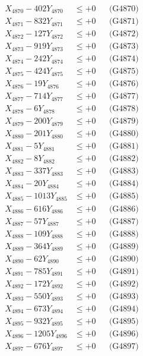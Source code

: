 \documentclass[a4paper,10pt]{article}
\begin{document}
{\begin{align}
X_{4870} - 402Y_{4870} &\leq +0 && \text{(G4870)} \\
\allowbreak
X_{4871} - 832Y_{4871} &\leq +0 && \text{(G4871)} \\
X_{4872} - 127Y_{4872} &\leq +0 && \text{(G4872)} \\
X_{4873} - 919Y_{4873} &\leq +0 && \text{(G4873)} \\
X_{4874} - 242Y_{4874} &\leq +0 && \text{(G4874)} \\
X_{4875} - 424Y_{4875} &\leq +0 && \text{(G4875)} \\
X_{4876} - 19Y_{4876} &\leq +0 && \text{(G4876)} \\
X_{4877} - 714Y_{4877} &\leq +0 && \text{(G4877)} \\
X_{4878} - 6Y_{4878} &\leq +0 && \text{(G4878)} \\
X_{4879} - 200Y_{4879} &\leq +0 && \text{(G4879)} \\
X_{4880} - 201Y_{4880} &\leq +0 && \text{(G4880)} \\
\allowbreak
X_{4881} - 5Y_{4881} &\leq +0 && \text{(G4881)} \\
X_{4882} - 8Y_{4882} &\leq +0 && \text{(G4882)} \\
X_{4883} - 337Y_{4883} &\leq +0 && \text{(G4883)} \\
X_{4884} - 20Y_{4884} &\leq +0 && \text{(G4884)} \\
X_{4885} - 1013Y_{4885} &\leq +0 && \text{(G4885)} \\
X_{4886} - 616Y_{4886} &\leq +0 && \text{(G4886)} \\
X_{4887} - 57Y_{4887} &\leq +0 && \text{(G4887)} \\
X_{4888} - 109Y_{4888} &\leq +0 && \text{(G4888)} \\
X_{4889} - 364Y_{4889} &\leq +0 && \text{(G4889)} \\
X_{4890} - 62Y_{4890} &\leq +0 && \text{(G4890)} \\
\allowbreak
X_{4891} - 785Y_{4891} &\leq +0 && \text{(G4891)} \\
X_{4892} - 172Y_{4892} &\leq +0 && \text{(G4892)} \\
X_{4893} - 550Y_{4893} &\leq +0 && \text{(G4893)} \\
X_{4894} - 673Y_{4894} &\leq +0 && \text{(G4894)} \\
X_{4895} - 932Y_{4895} &\leq +0 && \text{(G4895)} \\
X_{4896} - 1205Y_{4896} &\leq +0 && \text{(G4896)} \\
X_{4897} - 676Y_{4897} &\leq +0 && \text{(G4897)} \\

\end{align}}
\end{document}
